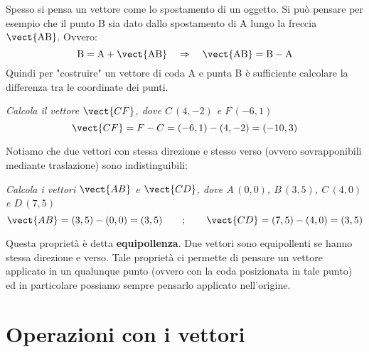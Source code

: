 Spesso si pensa un vettore come lo spostamento di un oggetto. Si può pensare per esempio che il punto B sia dato dallo spostamento di A lungo la freccia $\vect{\text{AB}}$. Ovvero:
\[\text{B} = \text{A}+\vect{\text{AB}} \quad \Rightarrow \quad \vect{\text{AB}} = \text{B}-\text{A}\]
Quindi per "costruire" un vettore di coda A e punta B è sufficiente calcolare la differenza tra le coordinate dei punti.
\begin{esempio}
\emph{Calcola il vettore $\vect{CF}$, dove $C\,(4,-2)$ e $F \, (-6,1)$}
\[\vect{CF} = F-C = (-6,1)-(4,-2) = (-10,3)\]
\end{esempio}

Notiamo che due vettori con stessa direzione e stesso verso (ovvero sovrapponibili mediante traslazione) sono indistinguibili:
\begin{esempio}
\emph{Calcola i vettori $\vect{AB}$ e $\vect{CD}$, dove $A\,(0,0)$, $B \, (3,5)$, $C \, (4,0)$ e $D \, (7,5)$}
\[\vect{AB} = (3,5)-(0,0) = (3,5) \qquad;\qquad \vect{CD} = (7,5)-(4,0) = (3,5)\]
\end{esempio}
Questa proprietà è detta \textbf{equipollenza}. Due vettori sono equipollenti se hanno stessa direzione e verso. Tale proprietà ci permette di pensare un vettore applicato in un qualunque punto (ovvero con la coda posizionata in tale punto) ed in particolare possiamo sempre pensarlo applicato nell'origine.

\section{Operazioni con i vettori}

